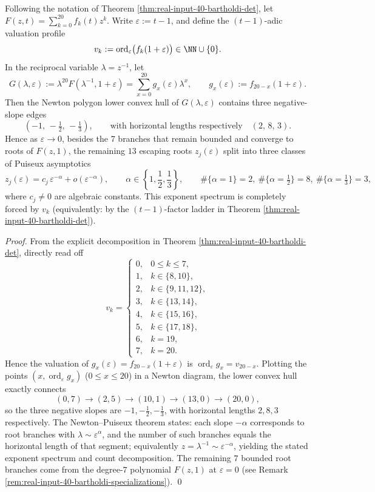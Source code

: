 \begin{proposition}[Newton--Puiseux escape exponent spectrum of the Bartholdi fugacity at \texorpdfstring{$t=1$}{t=1}]\label{prop:real-input-40-bartholdi-newton-puiseux-spectrum}
Following the notation of Theorem \ref{thm:real-input-40-bartholdi-det}, let \(F(z,t)=\sum_{k=0}^{20}f_k(t)z^k\).
Write \(\varepsilon:=t-1\), and define the \((t-1)\)-adic valuation profile
\[
v_k:=\operatorname{ord}_{\varepsilon}\bigl(f_k(1+\varepsilon)\bigr)\in\NN\cup\{0\}.
\]
In the reciprocal variable \(\lambda=z^{-1}\), let
\[
G(\lambda,\varepsilon):=\lambda^{20}F(\lambda^{-1},1+\varepsilon)
=\sum_{x=0}^{20}g_x(\varepsilon)\lambda^x,\qquad g_x(\varepsilon):=f_{20-x}(1+\varepsilon).
\]
Then the Newton polygon lower convex hull of \(G(\lambda,\varepsilon)\) contains three negative-slope edges
\[
(-1,\,-\tfrac12,\,-\tfrac13),
\qquad
\text{with horizontal lengths respectively}\quad (2,\,8,\,3).
\]
Hence as \(\varepsilon\to 0\), besides the \(7\) branches that remain bounded and converge to roots of \(F(z,1)\), the remaining \(13\) escaping roots \(z_j(\varepsilon)\) split into three classes of Puiseux asymptotics
\[
z_j(\varepsilon)=c_j\,\varepsilon^{-\alpha}+o\!\left(\varepsilon^{-\alpha}\right),
\qquad
\alpha\in\left\{1,\frac12,\frac13\right\},
\qquad
\#\{\alpha=1\}=2,\ \#\{\alpha=\tfrac12\}=8,\ \#\{\alpha=\tfrac13\}=3,
\]
where \(c_j\neq 0\) are algebraic constants. This exponent spectrum is completely forced by \(v_k\) (equivalently: by the \((t-1)\)-factor ladder in Theorem \ref{thm:real-input-40-bartholdi-det}).
\end{proposition}
\begin{proof}
From the explicit decomposition in Theorem \ref{thm:real-input-40-bartholdi-det}, directly read off
\[
v_k=
\begin{cases}
0,& 0\le k\le 7,\\
1,& k\in\{8,10\},\\
2,& k\in\{9,11,12\},\\
3,& k\in\{13,14\},\\
4,& k\in\{15,16\},\\
5,& k\in\{17,18\},\\
6,& k=19,\\
7,& k=20.
\end{cases}
\]
Hence the valuation of \(g_x(\varepsilon)=f_{20-x}(1+\varepsilon)\) is \(\operatorname{ord}_{\varepsilon}g_x=v_{20-x}\).
Plotting the points \((x,\operatorname{ord}_{\varepsilon}g_x)\) (\(0\le x\le 20\)) in a Newton diagram, the lower convex hull exactly connects
\[
(0,7)\to(2,5)\to(10,1)\to(13,0)\to(20,0),
\]
so the three negative slopes are \(-1,-\tfrac12,-\tfrac13\), with horizontal lengths \(2,8,3\) respectively.
The Newton--Puiseux theorem states: each slope \(-\alpha\) corresponds to root branches with \(\lambda\sim \varepsilon^{\alpha}\), and the number of such branches equals the horizontal length of that segment;
equivalently \(z=\lambda^{-1}\sim \varepsilon^{-\alpha}\), yielding the stated exponent spectrum and count decomposition.
The remaining \(7\) bounded root branches come from the degree-\(7\) polynomial \(F(z,1)\) at \(\varepsilon=0\) (see Remark \ref{rem:real-input-40-bartholdi-specializations}). \qed
\end{proof}

